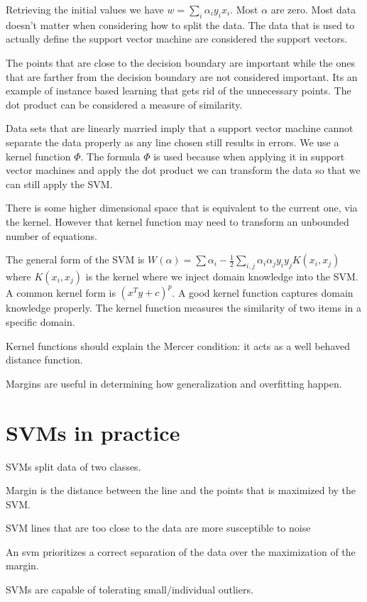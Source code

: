 \documentclass{article}
\begin{document}
 Retrieving the initial values we have $w = \sum_i \alpha_i y_i x_i$. Most
 $\alpha$ are zero. Most data doesn't matter when considering how to split the 
 data. The data that is used to actually define the support vector machine are
 considered the support vectors.

The points that are close to the decision boundary are important while the ones
that are farther from the decision boundary are not considered important. Its an
example of instance based learning that gets rid of the unnecessary points. The 
dot product can be considered a measure of similarity. 

Data sets that are linearly married imply that a support vector machine cannot
separate the data properly as any line chosen still results in errors.  We 
use a kernel function $\Phi$. The formula $\Phi$ is used because when applying 
it in support vector machines and apply the dot product we can transform 
the data so that we can still apply the SVM.

There is some higher dimensional space that is equivalent to the current one,
via the kernel. However that kernel function may need to transform an 
unbounded number of equations. 

The general form of the SVM is $W(\alpha) = \sum \alpha_i - \frac{1}{2}
\sum_{i,j} \alpha_i \alpha_j y_i y_j K(x_i, x_j)$ where $K(x_i, x_j)$ is the 
kernel where we inject domain knowledge into the SVM. A common kernel form is 
$(x^Ty + c)^p$. A good kernel function captures domain knowledge properly. The
kernel function measures the similarity of two items in a specific domain. 

Kernel functions should explain the Mercer condition: it acts as a well behaved
distance function. 

Margins are useful in determining how generalization and overfitting happen. 

\section{SVMs in practice}
SVMs split data of two classes. 

Margin is the distance between the line and the points that is maximized by the 
SVM. 

SVM lines that are too close to the data are more susceptible to noise

An svm prioritizes a correct separation of the data over the maximization of the
margin. 

SVMs are capable of tolerating small/individual outliers.
\end{document}
